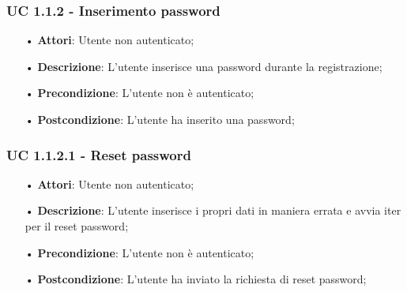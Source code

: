 \subsubsection{UC 1.1.2 - Inserimento password}
\begin{itemize}
\item[•]\textbf{Attori}: Utente non autenticato;
\item[•]\textbf{Descrizione}: L’utente inserisce una password durante la registrazione;
\item[•]\textbf{Precondizione}: L'utente non è autenticato;
\item[•]\textbf{Postcondizione}: L'utente ha inserito una password;
\end{itemize}

\subsubsection{UC 1.1.2.1 - Reset password}
\begin{itemize}
	\item[•]\textbf{Attori}: Utente non autenticato;
	\item[•]\textbf{Descrizione}: L’utente inserisce i propri dati in maniera errata e avvia iter per il reset password;
	\item[•]\textbf{Precondizione}: L’utente non è autenticato;
	\item[•]\textbf{Postcondizione}: L’utente ha inviato la richiesta di reset password;
\end{itemize}

